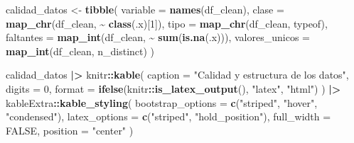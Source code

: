 \documentclass[
]{book}
\newenvironment{Shaded}{\begin{snugshade}}{\end{snugshade}}
\newcommand{\AttributeTok}[1]{\textcolor[rgb]{0.13,0.29,0.53}{#1}}
\newcommand{\ConstantTok}[1]{\textcolor[rgb]{0.56,0.35,0.01}{#1}}
\newcommand{\DecValTok}[1]{\textcolor[rgb]{0.00,0.00,0.81}{#1}}
\newcommand{\FunctionTok}[1]{\textcolor[rgb]{0.13,0.29,0.53}{\textbf{#1}}}
\newcommand{\NormalTok}[1]{#1}
\newcommand{\OtherTok}[1]{\textcolor[rgb]{0.56,0.35,0.01}{#1}}
\newcommand{\SpecialCharTok}[1]{\textcolor[rgb]{0.81,0.36,0.00}{\textbf{#1}}}
\newcommand{\StringTok}[1]{\textcolor[rgb]{0.31,0.60,0.02}{#1}}
\begin{document}
\begin{Shaded}
\begin{Highlighting}[]
\NormalTok{calidad\_datos }\OtherTok{\textless{}{-}} \FunctionTok{tibble}\NormalTok{(}
  \AttributeTok{variable =} \FunctionTok{names}\NormalTok{(df\_clean),}
  \AttributeTok{clase =} \FunctionTok{map\_chr}\NormalTok{(df\_clean, }\SpecialCharTok{\textasciitilde{}} \FunctionTok{class}\NormalTok{(.x)[}\DecValTok{1}\NormalTok{]),}
  \AttributeTok{tipo =} \FunctionTok{map\_chr}\NormalTok{(df\_clean, typeof),}
  \AttributeTok{faltantes =} \FunctionTok{map\_int}\NormalTok{(df\_clean, }\SpecialCharTok{\textasciitilde{}} \FunctionTok{sum}\NormalTok{(}\FunctionTok{is.na}\NormalTok{(.x))),}
  \AttributeTok{valores\_unicos =} \FunctionTok{map\_int}\NormalTok{(df\_clean, n\_distinct)}
\NormalTok{)}

\NormalTok{calidad\_datos }\SpecialCharTok{|\textgreater{}}
\NormalTok{  knitr}\SpecialCharTok{::}\FunctionTok{kable}\NormalTok{(}
    \AttributeTok{caption =} \StringTok{"Calidad y estructura de los datos"}\NormalTok{,}
    \AttributeTok{digits =} \DecValTok{0}\NormalTok{,}
    \AttributeTok{format =} \FunctionTok{ifelse}\NormalTok{(knitr}\SpecialCharTok{::}\FunctionTok{is\_latex\_output}\NormalTok{(), }\StringTok{"latex"}\NormalTok{, }\StringTok{"html"}\NormalTok{)}
\NormalTok{  ) }\SpecialCharTok{|\textgreater{}}
\NormalTok{  kableExtra}\SpecialCharTok{::}\FunctionTok{kable\_styling}\NormalTok{(}
    \AttributeTok{bootstrap\_options =} \FunctionTok{c}\NormalTok{(}\StringTok{"striped"}\NormalTok{, }\StringTok{"hover"}\NormalTok{, }\StringTok{"condensed"}\NormalTok{),}
    \AttributeTok{latex\_options =} \FunctionTok{c}\NormalTok{(}\StringTok{"striped"}\NormalTok{, }\StringTok{"hold\_position"}\NormalTok{),}
    \AttributeTok{full\_width =} \ConstantTok{FALSE}\NormalTok{,}
    \AttributeTok{position =} \StringTok{"center"}
\NormalTok{  )}
\end{Highlighting}
\end{Shaded}
\end{document}
